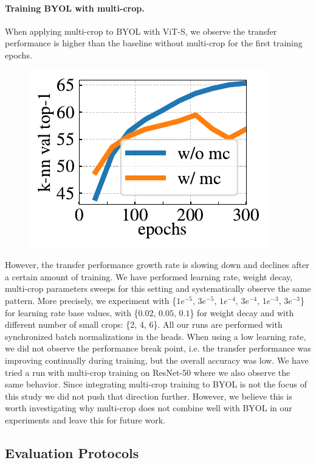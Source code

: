 \paragraph{Training BYOL with multi-crop.}
When applying multi-crop to BYOL with ViT-S, we observe the transfer performance is higher than the baseline without multi-crop for the first training epochs.
\begin{figure}[h]
\vspace{-0.8em}
\centering
\includegraphics[width=0.5\linewidth]{figure_byol.pdf}
\vspace{-0.8em}
\end{figure}
However, the transfer performance growth rate is slowing down and declines after a certain amount of training.
We have performed learning rate, weight decay, multi-crop parameters sweeps for this setting and systematically observe the same pattern.
More precisely, we experiment with \{$1e^{-5}$, $3e^{-5}$, $1e^{-4}$, $3e^{-4}$, $1e^{-3}$, $3e^{-3}$\} for learning rate base values, with \{$0.02$, $0.05$, $0.1$\} for weight decay and with different number of small crops: \{2, 4, 6\}.
All our runs are performed with synchronized batch normalizations in the heads.
When using a low learning rate, we did not observe the performance break point, i.e. the transfer performance was improving continually during training, but the overall accuracy was low.
We have tried a run with multi-crop training on ResNet-50 where we also observe the same behavior.
Since integrating multi-crop training to BYOL is not the focus of this study we did not push that direction further.
However, we believe this is worth investigating why multi-crop does not combine well with BYOL in our experiments and leave this for future work.

\subsection{Evaluation Protocols}
